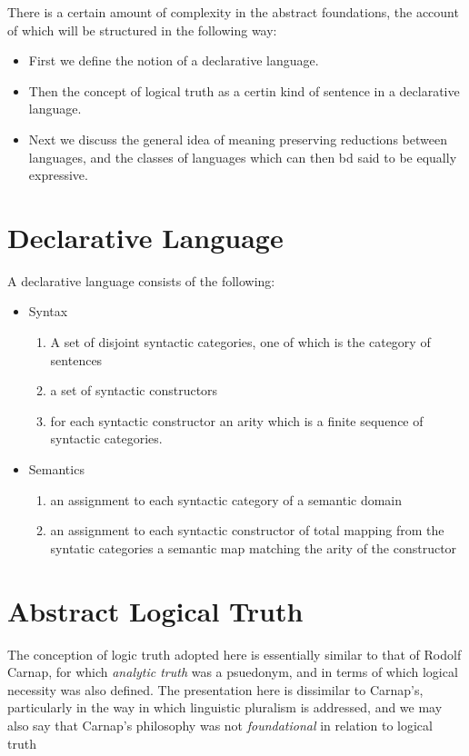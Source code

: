 There is a certain amount of complexity in the abstract foundations, the account of which will be structured in the following way:

\begin{itemize}
\item First we define the notion of a declarative language.
\item Then the concept of logical truth as a certin kind of sentence in a declarative language.
\item Next we discuss the general idea of meaning preserving reductions between languages, and the classes of languages which can then bd said to be equally expressive.
\end{itemize}

\section{Declarative Language}

A declarative language consists of the following:

\begin{itemize}
\item Syntax
\begin{enumerate}
\item A set of disjoint syntactic categories, one of which is the category of sentences
\item a set of syntactic constructors
\item for each syntactic constructor an arity which is a finite sequence of syntactic categories.
\end{enumerate}
\item Semantics
\begin{enumerate}
\item an assignment to each syntactic category of a semantic domain
\item an assignment to each syntactic constructor of 
total mapping from the syntatic categories
a semantic map matching the arity of the constructor
\end{enumerate}
\end{itemize}


\section{Abstract Logical Truth}

The conception of logic truth adopted here is essentially similar to that of Rodolf Carnap, for which \emph{analytic truth} was a psuedonym, and in terms of which logical necessity was also defined.
The presentation here is dissimilar to Carnap's, particularly in the way in which linguistic pluralism is addressed, and we may also say that Carnap's philosophy was not \emph{foundational} in relation to logical truth 

